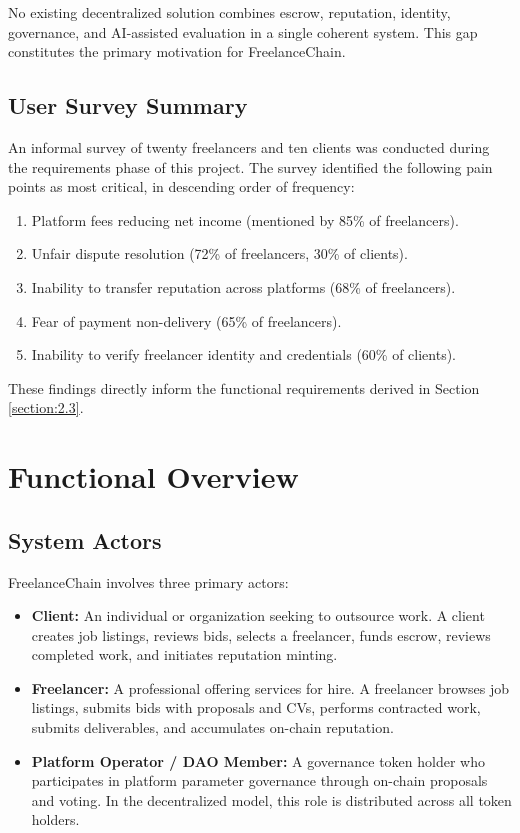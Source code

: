 No existing decentralized solution combines escrow, reputation, identity, governance, and AI-assisted evaluation in a single coherent system. This gap constitutes the primary motivation for FreelanceChain.

\subsection{User Survey Summary}

An informal survey of twenty freelancers and ten clients was conducted during the requirements phase of this project. The survey identified the following pain points as most critical, in descending order of frequency:
\begin{enumerate}
    \item Platform fees reducing net income (mentioned by 85\% of freelancers).
    \item Unfair dispute resolution (72\% of freelancers, 30\% of clients).
    \item Inability to transfer reputation across platforms (68\% of freelancers).
    \item Fear of payment non-delivery (65\% of freelancers).
    \item Inability to verify freelancer identity and credentials (60\% of clients).
\end{enumerate}

These findings directly inform the functional requirements derived in Section \ref{section:2.3}.

\section{Functional Overview}
\label{section:2.2}

\subsection{System Actors}

FreelanceChain involves three primary actors:

\begin{itemize}
    \item \textbf{Client:} An individual or organization seeking to outsource work. A client creates job listings, reviews bids, selects a freelancer, funds escrow, reviews completed work, and initiates reputation minting.
    \item \textbf{Freelancer:} A professional offering services for hire. A freelancer browses job listings, submits bids with proposals and CVs, performs contracted work, submits deliverables, and accumulates on-chain reputation.
    \item \textbf{Platform Operator / DAO Member:} A governance token holder who participates in platform parameter governance through on-chain proposals and voting. In the decentralized model, this role is distributed across all token holders.
\end{itemize}

